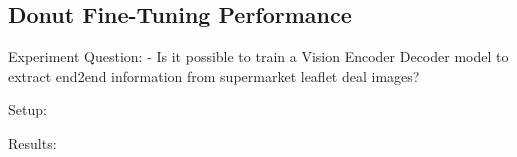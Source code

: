 \documentclass[11pt]{article}
\begin{document}






\subsection{Donut Fine-Tuning Performance}
Experiment Question:
- Is it possible to train a Vision Encoder Decoder model to extract end2end information from supermarket leaflet deal images?

Setup:

Results:






\end{document}
